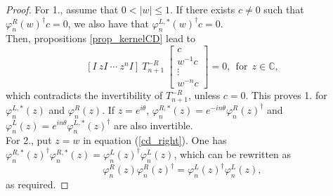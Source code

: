 \documentclass[11pt]{article}
\begin{document}
\begin{proof}
For 1., assume that $0< |w| \leq 1$. If there exists $c \neq 0$ such that $\varphi_{n}^{R}(w)^{\dag}c=0$, we also have that $\varphi_{n}^{L,*}(w)^{\dag}c=0$.\\
\noindent Then, propositions \ref{prop_kernelCD} lead to
$$
[I ~ zI ~\cdots ~ z^{n}I]~T_{n+1}^{-R}~\begin{bmatrix}
c \\
w^{-1}c \\
\vdots \\
w^{-n}c
\end{bmatrix}=0,~~ \mathrm{for}~~z \in \mathbb{C},
$$
which contradicts the invertibility of $T_{n+1}^{-R}$, unless $c=0$. This proves 1. for $\varphi_{n}^{L,*}(z)$ and $\varphi_{n}^{R}(z)$. If $z = e^{i\theta}$, $\varphi_{n}^{R,*}(z)= e^{-in\theta} \varphi_{n}^{R}(z)^{\dag}$ and $\varphi_{n}^{L}(z)= e^{in\theta} \varphi_{n}^{L,*}(z)^{\dag}$ are also invertible. \\
\indent For 2.,  put $z=w$ in equation (\ref{cd_right}).  One has $\varphi_{n}^{R,*}(z)^{\dag}\varphi_{n}^{R,*}(z) = \varphi_{n}^{L}(z)^{\dag}\varphi_{n}^{L}(z)$, which can be rewritten as 
$$
\varphi_{n}^{R}(z)\varphi_{n}^{R}(z)^{\dag} = \varphi_{n}^{L}(z)^{\dag}\varphi_{n}^{L}(z),
$$
as required.
\end{proof}
\end{document}
